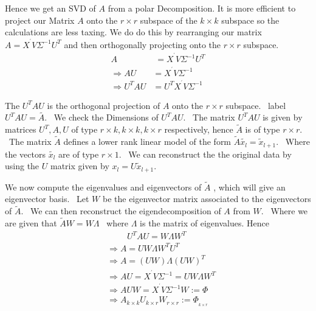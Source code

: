 \documentclass[12pt]{report}
\begin{document}
Hence we get an SVD of $A$ from a polar Decomposition. It is more efficient to project our Matrix $A$ onto the $r\times r$ subspace of the $k\times k$ subspace so the calculations are less taxing.
We do do this by rearranging our matrix $A=X^{^{\prime }}V\Sigma ^{-1}U^{T}$
and then orthogonally projecting onto the $r\times r$ subspace.
\begin{equation}
    \begin{aligned}
    A&\;=X^{^{\prime }}V\Sigma ^{-1}U^{T} \\
    \Longrightarrow AU&=X^{^{\prime }}V\Sigma ^{-1} \\
    \Longrightarrow U^{T}AU&=U^{T}X^{^{\prime }}V\Sigma ^{-1}
    \end{aligned}
\end{equation}

The $U^{T}AU$ is the orthogonal projection of $A$ onto the $r\times r$
subspace. \ label $U^{T}AU=\widetilde{A\text{.}}$ \ We check the Dimensions
of $U^{T}AU$. \ The matrix $U^{T}AU$ is given by matrices $U^{T},A,U$ of
type $r\times k,k\times k,k\times r$ respectively, hence $\widetilde{A}$ is
of type $r\times r.$ \ The matrix $\widetilde{A}$ defines a lower rank
linear model of the form  $\widetilde{A}\widetilde{x_{l}}=\widetilde{x}_{l+1}
$. \ Where the vectors $\widetilde{x_{l}}$ are of type $r\times 1$. \ We can
reconstruct the the original data by using the $U$ matrix given by $x_{l}=U%
\widetilde{x}_{l+1}$. \ 

We now compute the eigenvalues and eigenvectors of $\widetilde{A}$ , which
will give an eigenvector basis. \ Let $W$ be the eigenvector matrix
associated to the eigenvectors of $\widetilde{A}$. \ We can then reconstruct
the eigendecomposition of $A$ from $W$. \ Where we are given that $%
\widetilde{A}W=W\Lambda $ \ where $\Lambda $ is the matrix of eigenvalues. Hence 
\begin{equation}
    \begin{aligned}
    &\phantom{3333i} U^{T}AU=W\Lambda W^{T} \\
    &\Longrightarrow A=UW\Lambda W^{T}U^{T} \\
    &\Longrightarrow A=(UW)\Lambda (UW)^{T} \\
    &\Longrightarrow AU=X^{^{\prime }}V\Sigma ^{-1}=UW\Lambda W^{T} \\
    &\Longrightarrow AUW=X^{^{\prime }}V\Sigma ^{-1}W:=\Phi  \\
    &\Longrightarrow A_{k\times k}U_{k\times r}W_{r\times r}:=\Phi _{_{k\times r}}
    \end{aligned}
\end{equation}
\end{document}
